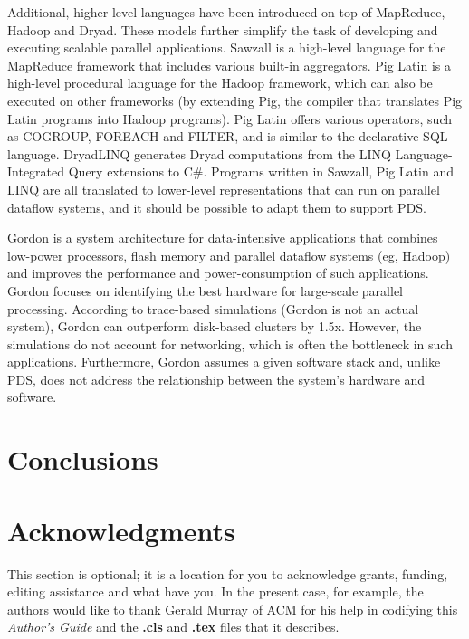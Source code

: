 \documentclass{acm_proc_article-sp}
\begin{document}
Additional, higher-level languages have been introduced on top of MapReduce, Hadoop and Dryad. These models further simplify the task of developing and executing scalable parallel applications. Sawzall \cite{sawzall} is a high-level language for the MapReduce framework that includes various built-in aggregators. Pig Latin \cite{piglatin} is a high-level procedural language for the Hadoop framework, which can also be executed on other frameworks (by extending Pig, the compiler that translates Pig Latin programs into Hadoop programs). Pig Latin offers various operators, such as COGROUP, FOREACH and FILTER, and is similar to the declarative SQL language. DryadLINQ \cite{dryadlinq} generates Dryad computations from the LINQ Language-Integrated Query extensions to C\#. Programs written in Sawzall, Pig Latin and LINQ are all translated to lower-level representations that can run on parallel dataflow systems, and it should be possible to adapt them to support PDS.

Gordon \cite{gordon} is a system architecture for data-intensive applications that combines low-power processors, flash memory and parallel dataflow systems (eg, Hadoop) and improves the performance and power-consumption of such applications. Gordon focuses on identifying the best hardware for large-scale parallel processing. According to trace-based simulations (Gordon is not an actual system), Gordon can outperform disk-based clusters by 1.5x. However, the simulations do not account for networking, which is often the bottleneck in such applications. Furthermore, Gordon assumes a given software stack and, unlike PDS, does not address the relationship between the system's hardware and software.

\section{Conclusions}


\section{Acknowledgments}
This section is optional; it is a location for you
to acknowledge grants, funding, editing assistance and
what have you.  In the present case, for example, the
authors would like to thank Gerald Murray of ACM for
his help in codifying this \textit{Author's Guide}
and the \textbf{.cls} and \textbf{.tex} files that it describes.

%

%

\balancecolumns
\end{document}
